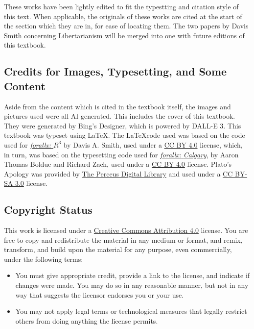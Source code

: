These works have been lightly edited to fit the typestting and citation style of this text. When applicable, the originals of these works are cited at the start of the section which they are in, for ease of locating them. The two papers by Davis Smith concerning Libertarianism will be merged into one with future editions of this textbook.

\subsection{Credits for Images, Typesetting, and Some Content}
Aside from the content which is cited in the textbook itself, the images and pictures used were all AI generated. This includes the cover of this textbook. They were generated by Bing's Designer, which is powered by DALL-E 3. This textbook was typeset using \LaTeX. The \LaTeX  code used was based on the code used for \href{https://github.com/ProfDavisSmith/forallxR3#readme}{\emph{forallx:} \emph{$R^3$}} by Davis A. Smith, used under a 
\href{https://creativecommons.org/licenses/by/4.0/}{CC BY 4.0} license, which, in turn, was based on the typesetting code used for \href{https://forallx.openlogicproject.org/}{\emph{forallx:} \emph{Calgary}}, 
by Aaron Thomas-Bolduc and Richard Zach, used under a 
\href{https://creativecommons.org/licenses/by/4.0/}{CC BY 4.0} license.  Plato's Apology was provided by \href{http://www.perseus.tufts.edu/hopper/}{The Perceus Digital Library} and used under a \href{https://creativecommons.org/licenses/by-sa/3.0/us/}{CC BY-SA 3.0} license.

\subsection{Copyright Status}

This work is licensed under a \href{https://creativecommons.org/licenses/by/4.0/}{Creative Commons Attribution 4.0} license.
You are free to copy and redistribute the material in any medium or format, and  remix, transform, and build upon the material for any purpose, even commercially, under the following terms:
\begin{itemize}
\item You must give appropriate credit, provide a link to the license, and indicate if changes were made. You may do so in any reasonable manner, but not in any way that suggests the licensor endorses you or your use.
\item You may not apply legal terms or technological measures that legally restrict others from doing anything the license permits.
\end{itemize}

